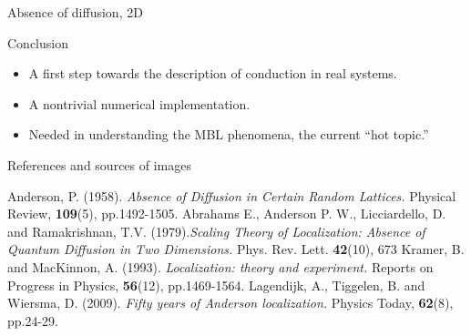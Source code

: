 \documentclass[1pt]{beamer}
\begin{document}
\begin{frame}{Absence of diffusion, 2D}
\begin{figure}
\end{figure}

\end{frame}
\begin{frame}{Conclusion}
\begin{itemize}
	\item A first step towards the description of conduction in real systems. \vspace{10mm}
	\item A nontrivial numerical implementation.\vspace{10mm}
	\item Needed in understanding the MBL phenomena, the current ``hot topic.''
\end{itemize}
\end{frame}
\begin{frame}{References and sources of images}
   
 \begin{thebibliography}{10}
   
 \beamertemplatebookbibitems



   
 \beamertemplatearticlebibitems

Anderson, P. (1958). \emph{Absence of Diffusion in Certain Random Lattices.} Physical Review, \textbf{109}(5), pp.1492-1505.
Abrahams E., Anderson P. W., Licciardello, D. and Ramakrishnan, T.V. (1979).\emph{Scaling Theory of Localization: Absence of Quantum Diffusion in Two Dimensions.} Phys. Rev. Lett. \textbf{42}(10), 673
Kramer, B. and MacKinnon, A. (1993). \emph{Localization: theory and experiment.} Reports on Progress in Physics, \textbf{56}(12), pp.1469-1564.
Lagendijk, A., Tiggelen, B. and Wiersma, D. (2009). \emph{Fifty years of Anderson localization.} Physics Today, \textbf{62}(8), pp.24-29.



 \end{thebibliography}
\end{frame}
\end{document}
